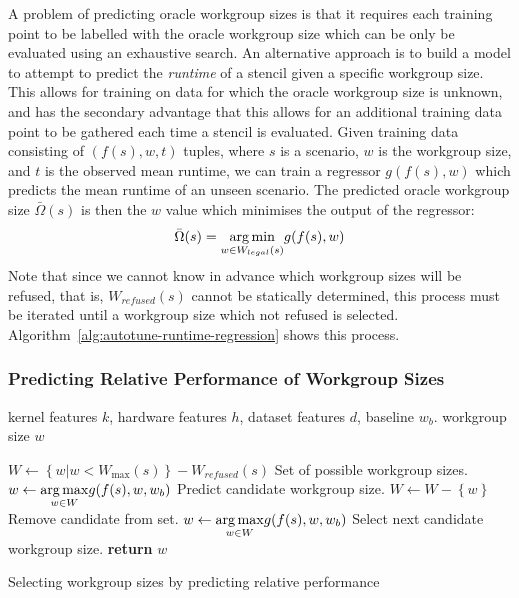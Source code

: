 \documentclass[nonatbib,preprint,9pt]{sigplanconf}
\begin{document}
A problem of predicting oracle workgroup sizes is that it requires
each training point to be labelled with the oracle workgroup size
which can be only be evaluated using an exhaustive search. An
alternative approach is to build a model to attempt to predict the
\emph{runtime} of a stencil given a specific workgroup size. This
allows for training on data for which the oracle workgroup size is
unknown, and has the secondary advantage that this allows for an
additional training data point to be gathered each time a stencil is
evaluated. Given training data consisting of $(f(s),w,t)$ tuples,
where $s$ is a scenario, $w$ is the workgroup size, and $t$ is the
observed mean runtime, we can train a regressor $g(f(s), w)$ which
predicts the mean runtime of an unseen scenario. The predicted oracle
workgroup size $\bar{\Omega}(s)$ is then the $w$ value which minimises
the output of the regressor:
%
\begin{equation}
  \bar{\Omega}(s) = \underset{w \in W_{legal}(s)}{\operatorname*{arg\,min}} g(f(s), w)
\end{equation}
%
Note that since we cannot know in advance which workgroup sizes will
be refused, that is, $W_{refused}(s)$ cannot be statically determined,
this process must be iterated until a workgroup size which not refused
is selected. Algorithm~\ref{alg:autotune-runtime-regression} shows
this process.


\subsubsection{Predicting Relative Performance of Workgroup Sizes}

\begin{algorithm}
\begin{algorithmic}[1]
\Require kernel features $k$, hardware features $h$, dataset features
$d$, baseline $w_b$.
\Ensure workgroup size $w$

\State $W \leftarrow \left\{ w | w < W_{\max}(s) \right\} - W_{refused}(s)$
\Comment Set of possible workgroup sizes.
\State $w \leftarrow \underset{w \in W}{\operatorname*{arg\,max}} g(f(s), w,w_b)$
\Comment Predict candidate workgroup size.
  \State $W \leftarrow W - \left\{ w \right\}$
  \Comment Remove candidate from set.
  \State $w \leftarrow \underset{w \in W}{\operatorname*{arg\,max}} g(f(s), w,w_b)$
  \Comment Select next candidate workgroup size.
\EndWhile
\State \textbf{return} $w$
\end{algorithmic}
\caption{Selecting workgroup sizes by predicting relative performance}
\label{alg:autotune-speedup-regression}
\end{algorithm}
\end{document}
